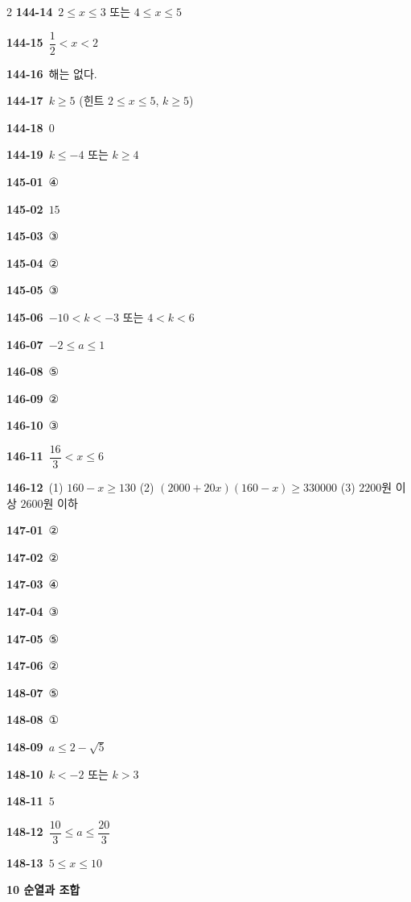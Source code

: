 \documentclass[10pt,a4paper]{article}
\begin{document}
\begin{multicols}{2}
\noindent\textbf{144-14}\ $2\le x\le 3$ 또는 $4\le x\le 5$\par
\noindent\textbf{144-15}\ $\dfrac{1}{2}<x<2$\par
\noindent\textbf{144-16}\ 해는 없다.\par
\noindent\textbf{144-17}\ $k\ge 5$ (힌트 $2\le x\le 5$, $k\ge 5$)\par
\noindent\textbf{144-18}\ $0$\par
\noindent\textbf{144-19}\ $k\le -4$ 또는 $k\ge 4$\par
\noindent\textbf{145-01}\ ④\par
\noindent\textbf{145-02}\ $15$\par
\noindent\textbf{145-03}\ ③\par
\noindent\textbf{145-04}\ ②\par
\noindent\textbf{145-05}\ ③\par
\noindent\textbf{145-06}\ $-10<k<-3$ 또는 $4<k<6$\par
\noindent\textbf{146-07}\ $-2\le a\le 1$\par
\noindent\textbf{146-08}\ ⑤\par
\noindent\textbf{146-09}\ ②\par
\noindent\textbf{146-10}\ ③\par
\noindent\textbf{146-11}\ $\dfrac{16}{3}<x\le 6$\par
\noindent\textbf{146-12}\ (1) $160-x\ge 130$ (2) $(2000+20x)(160-x)\ge 330000$ (3) $2200$원 이상 $2600$원 이하\par
\noindent\textbf{147-01}\ ②\par
\noindent\textbf{147-02}\ ②\par
\noindent\textbf{147-03}\ ④\par
\noindent\textbf{147-04}\ ③\par
\noindent\textbf{147-05}\ ⑤\par
\noindent\textbf{147-06}\ ②\par
\noindent\textbf{148-07}\ ⑤\par
\noindent\textbf{148-08}\ ①\par
\noindent\textbf{148-09}\ $a\le 2-\sqrt{5}$\par
\noindent\textbf{148-10}\ $k<-2$ 또는 $k>3$\par
\noindent\textbf{148-11}\ $5$\par
\noindent\textbf{148-12}\ $\dfrac{10}{3}\le a\le \dfrac{20}{3}$\par
\noindent\textbf{148-13}\ $5\le x\le 10$\par
\noindent\textbf{10 순열과 조합}\par\smallskip

\end{multicols}
\end{document}
